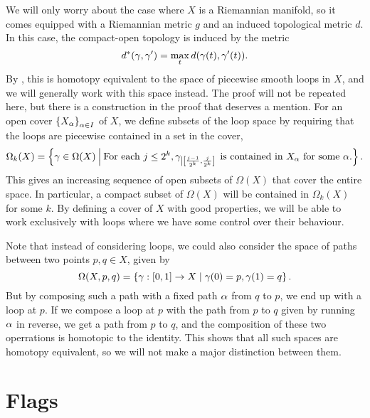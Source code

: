 We will only worry about the case where $X$ is a Riemannian manifold,
so it comes equipped with a Riemannian metric $g$ and an induced
topological metric $d$. In this case, the compact-open topology is
induced by the metric
\[ d^*(\gamma,\gamma') = \max_t d(\gamma(t),\gamma'(t)). \]
By \cite[Theorem 17.1]{milnor}, this is homotopy equivalent to the
space of piecewise smooth loops in $X$, and we will generally work
with this space instead. The proof will not be repeated here, but
there is a construction in the proof that deserves a mention. For an
open cover $\left\{ X_\alpha \right\}_{\alpha\in I}$ of $X$, we define subsets of the
loop space by requiring that the loops are piecewise contained in a
set in the cover,
\[ \Omega_k(X) = \left\{ \gamma \in \Omega(X) \: \Big\vert\:
  \text{For each } j \leq 2^k, \gamma_{\left|\left[
        \frac{j-1}{2^k},\frac{j}{2^k} \right]\right.} \text{ is 
    contained in $X_\alpha$ for some $\alpha$.}  \right\}. \]
This gives an increasing sequence of open subsets of $\Omega(X)$
that cover the entire space. In particular, a compact subset of
$\Omega(X)$ will be contained in $\Omega_k(X)$ for some $k$. By
defining a cover of $X$ with good properties, we will be able to work
exclusively with loops where we have some control
over their behaviour.



Note that instead of considering loops, we could also consider the
space of paths between two points $p,q\in X$, given by
\[ \Omega(X,p,q) = \left\{  \gamma : [0,1] \to X \mid \gamma(0) = p, \gamma(1) = q
 \right\}. \]
But by composing such a path with a fixed path $\alpha$ from $q$ to $p$,
we end up with a loop at $p$. If we compose a loop at $p$ with the
path from $p$ to $q$ given by running $\alpha$ in reverse, we get a path
from $p$ to $q$, and the composition of these two operrations is
homotopic to the identity. This shows that all such spaces 
are homotopy equivalent, so we will not make a major distinction
between them.

\section{Flags}
\label{sec:flags}

